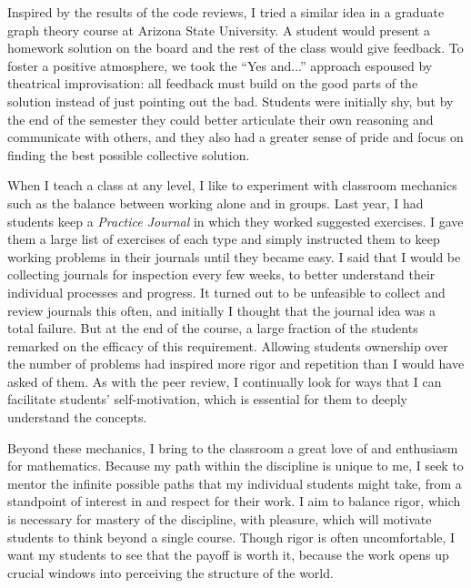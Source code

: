 \documentclass[12pt]{article}
\begin{document}
Inspired by the results of the code reviews, I tried a similar idea in a
graduate graph theory course at Arizona State University. 
A student would present a homework solution on the board and the rest of the
class would give feedback. 
To foster a positive atmosphere, we took the ``Yes and...'' approach espoused
by theatrical improvisation: all feedback must build on the
good parts of the solution instead of just pointing out the bad. 
Students were initially shy, but by the end of the semester they could better 
articulate their own reasoning and communicate with others, and they also
had a greater sense of pride and focus on finding the best possible
collective solution. 

When I teach a class at any level, I like to experiment with classroom
mechanics such as the balance between working alone and in groups. 
Last year, I had students keep a \emph{Practice Journal} in which they worked
suggested exercises. I gave them a large list of exercises of 
each type and simply instructed them to keep working problems in their journals
until they became easy. I said that I would 
be collecting journals for inspection every few weeks, to better understand
their individual processes and progress.  It turned out to be
unfeasible to collect and review journals this often, and initially I thought
that the journal idea was a total failure. But at the end of the course, 
a large fraction of the students remarked on the efficacy of this requirement. 
Allowing students ownership over the number of problems had inspired more rigor
and repetition than I would have asked of them. As with the peer review, I
continually look for ways that I can facilitate students' self-motivation, 
which is essential for them to deeply understand the concepts.

Beyond these mechanics, I bring to the classroom a great love of and enthusiasm
for mathematics. Because my path within the discipline is unique to me, 
I seek to mentor the infinite possible paths that my individual students might take, from a standpoint of interest in and respect for their work. 
I aim to balance rigor, which is necessary for mastery of the discipline, with
pleasure, which will motivate students to think beyond a single course. 
Though rigor is often uncomfortable, I want my students to see that the payoff
is worth it, because the work opens up crucial windows into perceiving 
the structure of the world. 
\end{document}
